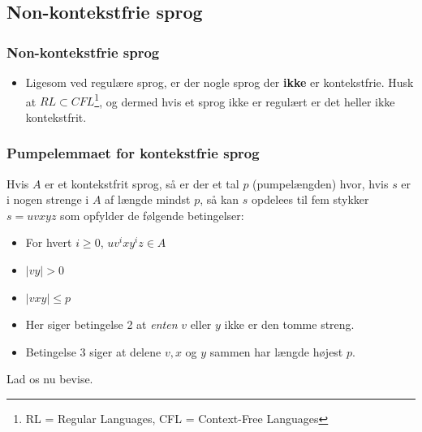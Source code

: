 \subsection{Non-kontekstfrie sprog}%
\label{subsec:nonkontekstfriesprog}

\begin{frame}
  \frametitle{Non-kontekstfrie sprog}
  \begin{itemize}
	\item Ligesom ved regulære sprog, er der nogle sprog der \textbf{ikke} er kontekstfrie. Husk at $RL \subset CFL$\footnote{RL = Regular Languages, CFL = Context-Free Languages}, og dermed hvis et sprog ikke er regulært er det heller ikke kontekstfrit.
  \end{itemize}
\end{frame}

\begin{frame}[allowframebreaks]
  \frametitle{Pumpelemmaet for kontekstfrie sprog}

  \begin{theorem}
	Hvis $A$ er et kontekstfrit sprog, så er der et tal $p$ (pumpelængden) hvor, hvis $s$ er i nogen strenge i $A$ af længde mindst $p$, så kan $s$ opdelees til fem stykker $s = uvxyz$ som opfylder de følgende betingelser:
	\begin{itemize}
	  \item For hvert $i \ge 0$, $uv^{i}xy^{i}z \in A$
	  \item $|vy| > 0$
	  \item $|vxy| \le p$
	\end{itemize}
  \end{theorem}
  \begin{itemize}
	\item Her siger betingelse 2 at \textit{enten} $v$ eller $y$ ikke er den tomme streng.
	\item Betingelse 3 siger at delene $v, x$ og $y$ sammen har længde højest $p$.
  \end{itemize}
  \item Lad os nu bevise.
\end{frame}


